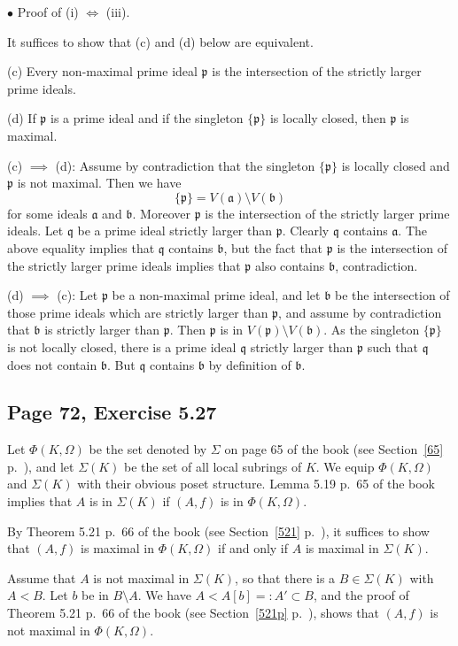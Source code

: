 \documentclass[parskip=half,fontsize=12pt]{scrartcl}%
\newcommand{\mf}{\mathfrak}
\newcommand{\aaa}{\mf a}
\newcommand{\bbb}{\mf b}
\newcommand{\ppp}{\mf p}
\newcommand{\qqq}{\mf q}
\newcommand{\bu}{\bullet}
\begin{document}
$\bu$ Proof of (i) $\iff$ (iii). 

It suffices to show that (c) and (d) below are equivalent.

(c) Every non-maximal prime ideal $\ppp$ is the intersection of the strictly larger prime ideals.

(d) If $\ppp$ is a prime ideal and if the singleton $\{\ppp\}$ is locally closed, then $\ppp$ is maximal.

(c) $\implies$ (d): Assume by contradiction that the singleton $\{\ppp\}$ is locally closed and $\ppp$ is not maximal. Then we have 
$$
\{\ppp\}=V(\aaa)\setminus V(\bbb)
$$ 
for some ideals $\aaa$ and $\bbb$. Moreover $\ppp$ is the intersection of the strictly larger prime ideals. Let $\qqq$ be a prime ideal strictly larger than $\ppp$. Clearly $\qqq$ contains $\aaa$. The above equality implies that $\qqq$ contains $\bbb$, but the fact that $\ppp$ is the intersection of the strictly larger prime ideals implies that $\ppp$ also contains $\bbb$, contradiction.

(d) $\implies$ (c): Let $\ppp$ be a non-maximal prime ideal, and let $\bbb$ be the intersection of those prime ideals which are strictly larger than $\ppp$, and assume by contradiction that $\bbb$ is strictly larger than $\ppp$. Then $\ppp$ is in $V(\ppp)\setminus V(\bbb)$. As the singleton $\{\ppp\}$ is not locally closed, there is a prime ideal $\qqq$ strictly larger than $\ppp$ such that $\qqq$ does not contain $\bbb$. But $\qqq$ contains $\bbb$ by definition of $\bbb$. 

\subsection{Page 72, Exercise 5.27}%

Let $\Phi(K,\Omega)$ be the set denoted by $\Sigma$ on page 65 of the book (see Section~\ref{65} p.~\pageref{65}), and let $\Sigma(K)$ be the set of all local subrings of $K$. We equip $\Phi(K,\Omega)$ and $\Sigma(K)$ with their obvious poset structure. %
Lemma 5.19 p.~65 of the book implies that $A$ is in $\Sigma(K)$ if $(A,f)$ is in $\Phi(K,\Omega)$.

By Theorem 5.21 p.~66 of the book (see Section~\ref{521} p.~\pageref{521}), it suffices to show that $(A,f)$ is maximal in $\Phi(K,\Omega)$ if and only if $A$ is maximal in $\Sigma(K)$. 

Assume that $A$ is not maximal in $\Sigma(K)$, so that there is a $B\in\Sigma(K)$ with $A<B$. Let $b$ be in $B\setminus A$. We have $A<A[b]=:A'\subset B$, and the proof of Theorem 5.21 p.~66 of the book (see Section~\ref{521p} p.~\pageref{521p}), shows that $(A,f)$ is not maximal in $\Phi(K,\Omega)$. 
\end{document}
